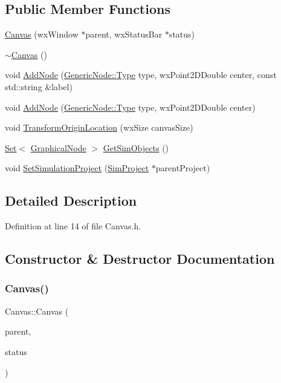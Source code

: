 \subsection*{Public Member Functions}
\begin{DoxyCompactItemize}
\item 
\hyperlink{class_canvas_ae31d296f6d7a0d3a2958ca1d7e61a51d}{Canvas} (wx\+Window $\ast$parent, wx\+Status\+Bar $\ast$status)
\item 
\hyperlink{class_canvas_a237c4549ad2e27c729cd1f71e89f0fd9}{$\sim$\+Canvas} ()
\item 
void \hyperlink{class_canvas_aec9038762b17b62ff6126bd6277a9cd8}{Add\+Node} (\hyperlink{class_generic_node_a9e7985ab9bbfa1c85091adc0ab71a6b6}{Generic\+Node\+::\+Type} type, wx\+Point2\+D\+Double center, const std\+::string \&label)
\item 
void \hyperlink{class_canvas_aaec53b68c7b24704e399b565731ed545}{Add\+Node} (\hyperlink{class_generic_node_a9e7985ab9bbfa1c85091adc0ab71a6b6}{Generic\+Node\+::\+Type} type, wx\+Point2\+D\+Double center)
\item 
void \hyperlink{class_canvas_a4afa0e24da7b82be3696131c13d89404}{Transform\+Origin\+Location} (wx\+Size canvas\+Size)
\item 
\hyperlink{class_set}{Set}$<$ \hyperlink{class_graphical_node}{Graphical\+Node} $>$ \hyperlink{class_canvas_a21d8ffb18a14cb10af590d3d66efe956}{Get\+Sim\+Objects} ()
\item 
void \hyperlink{class_canvas_ae7b17a82b7376ee4105b8f36179ab90e}{Set\+Simulation\+Project} (\hyperlink{class_sim_project}{Sim\+Project} $\ast$parent\+Project)
\end{DoxyCompactItemize}


\subsection{Detailed Description}


Definition at line 14 of file Canvas.\+h.



\subsection{Constructor \& Destructor Documentation}
\mbox{\label{class_canvas_ae31d296f6d7a0d3a2958ca1d7e61a51d}} 
\subsubsection{\texorpdfstring{Canvas()}{Canvas()}}
{\footnotesize\ttfamily Canvas\+::\+Canvas (\begin{DoxyParamCaption}\item[{wx\+Window $\ast$}]{parent,  }\item[{wx\+Status\+Bar $\ast$}]{status }\end{DoxyParamCaption})}



